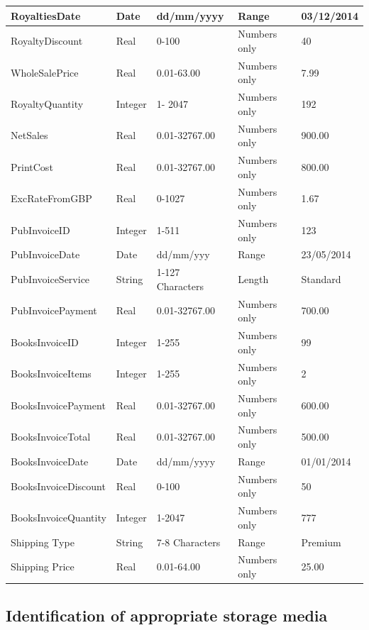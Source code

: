 \begin{center}
\begin{tabular}{|p{2cm}|p{1cm}|p{2.5cm}|p{1.5cm}|p{3cm}|}
    RoyaltiesDate & Date & dd/mm/yyyy & Range & 03/12/2014 \\ \hline
    RoyaltyDiscount & Real & 0-100 & Numbers only & 40 \\ \hline
    WholeSalePrice & Real & 0.01-63.00 & Numbers only & 7.99 \\ \hline
    RoyaltyQuantity & Integer & 1- 2047 & Numbers only & 192 \\ \hline
    NetSales & Real & 0.01-32767.00 & Numbers only & 900.00 \\ \hline
    PrintCost & Real & 0.01-32767.00 & Numbers only & 800.00 \\ \hline
    ExcRateFromGBP & Real & 0-1027 & Numbers only & 1.67 \\ \hline
    PubInvoiceID & Integer & 1-511 & Numbers only & 123 \\ \hline
    PubInvoiceDate & Date & dd/mm/yyy & Range & 23/05/2014 \\ \hline
    PubInvoiceService & String & 1-127 Characters & Length & Standard \\ \hline
    PubInvoicePayment & Real & 0.01-32767.00 & Numbers only & 700.00 \\ \hline
    BooksInvoiceID & Integer & 1-255 & Numbers only & 99 \\ \hline
    BooksInvoiceItems & Integer & 1-255 & Numbers only & 2 \\ \hline
    BooksInvoicePayment & Real & 0.01-32767.00 & Numbers only & 600.00 \\ \hline
    BooksInvoiceTotal & Real & 0.01-32767.00 & Numbers only & 500.00 \\ \hline
    BooksInvoiceDate & Date & dd/mm/yyyy & Range & 01/01/2014 \\ \hline
    BooksInvoiceDiscount & Real & 0-100 & Numbers only & 50 \\ \hline
    BooksInvoiceQuantity & Integer & 1-2047 & Numbers only & 777 \\ \hline
    Shipping Type & String & 7-8 Characters & Range & Premium \\ \hline
    Shipping Price & Real & 0.01-64.00 & Numbers only & 25.00 \\ \hline
    \hline
\end{tabular}
\end{center}

\subsection{Identification of appropriate storage media}


